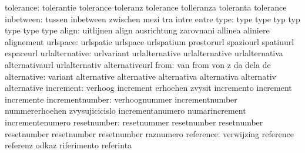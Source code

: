                 tolerance: tolerantie                tolerance
                           toleranz                  tolerance
                           tolleranza                toleranta
                           tolerance
                inbetween: tussen                    inbetween
                           zwischen                  mezi
                           tra                       intre
                           entre
                     type: type                      type
                           typ                       typ
                           type                      type
                           type
                    align: uitlijnen                 align
                           ausrichtung               zarovnani
                           allinea                   aliniere
                           alignement
                 urlspace: urlspatie                 urlspace
                           urlspatium                prostorurl
                           spaziourl                 spatiuurl
                           espaceurl
           urlalternative: urlvariant                urlalternative
                           urlalternative            urlalternativa
                           alternativaurl            urlalternativ
                           alternativeurl
                     from: van                       from
                           von                       z
                           da                        dela
                           de
              alternative: variant                   alternative
                           alternative               alternativa
                           alternativa               alternativ
                           alternative
                increment: verhoog                   increment
                           erhoehen                  zvysit
                           incremento                increment
                           incremente
          incrementnumber: verhoognummer             incrementnumber
                           nummererhoehen            zvysujicicislo
                           incrementanumero          numarincrement
                           incrementenumero
              resetnumber: resetnummer               resetnumber
                           resetnumber               resetnumber
                           resetnumber               resetnumber
                           raznumero
                reference: verwijzing                reference
                           referenz                  odkaz
                           riferimento               referinta
